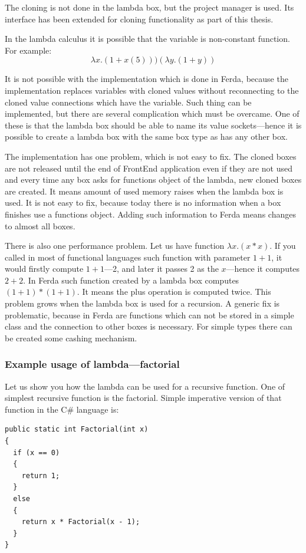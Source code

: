 \documentclass[a4paper,12pt]{book}
\begin{document}
The cloning is not done in the lambda box, but the project manager is used. Its interface has been extended for cloning functionality as part of this thesis.

In the lambda calculus it is possible that the variable is non-constant function. For example:
\begin{equation}
\lambda x.(1+x(5)))(\lambda y.(1+y))
\end{equation}

It is not possible with the implementation which is done in Ferda, because the implementation replaces variables with cloned values without reconnecting to the cloned value connections which have the variable. Such thing can be implemented, but there are several complication which must be overcame. One of these is that the lambda box should be able to name its value sockets---hence it is possible to create a lambda box with the same box type as has any other box.

The implementation has one problem, which is not easy to fix. The cloned boxes are not released until the end of FrontEnd application even if they are not used and every time any box asks for functions object of the lambda, new cloned boxes are created. It means amount of used memory raises when the lambda box is used. It is not easy to fix, because today there is no information when a box finishes use a functions object. Adding such information to Ferda means changes to almost all boxes.

There is also one performance problem. Let us have function $\lambda x.(x*x)$. If you called in most of functional languages such function with parameter $1+1$, it would firstly compute $1+1$---2, and later it passes 2 as the $x$---hence it computes $2+2$. In Ferda such function created by a lambda box computes $(1+1)*(1+1)$. It means the plus operation is computed twice. This problem grows when the lambda box is used for a recursion. A generic fix is problematic, because in Ferda are functions which can not be stored in a simple class and the connection to other boxes is necessary. For simple types there can be created some cashing mechanism.

\subsubsection{Example usage of lambda---factorial}
Let us show you how the lambda can be used for a recursive function. One of simplest recursive function is the factorial. Simple imperative version of that function in the C\# language is: 
\begin{verbatim}
public static int Factorial(int x)
{
  if (x == 0)
  {
    return 1;
  }
  else
  {
    return x * Factorial(x - 1);
  }
}
\end{verbatim}
	
\end{document}
